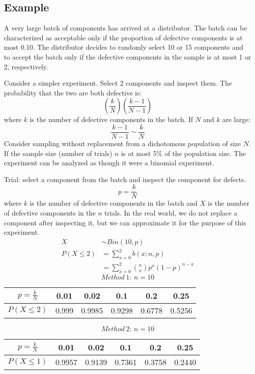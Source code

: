 \documentclass{math}
\begin{document}
\subsection*{Example}
A very large batch of components has arrived at a distributor. The batch
can be characterized as acceptable only if the proportion of defective
components is at most 0.10. The distributor decides to randomly select 10 or
15 components and to accept the batch only if the defective components in the
sample is at most 1 or 2, respectively. \par
Consider a simpler experiment. Select 2 components and inspect them. The
probability that the two are both defective is:
\[ (\frac{k}{N})(\frac{k-1}{N-1}) \]
where \( k \) is the number of defective components in the batch. If \( N \)
and \( k \) are large:
\[ \frac{k-1}{N-1}\sim\frac{k}{N} \]
Consider sampling without replacement from a dichotomous population of size
\( N \). If the sample size (number of trials) \( n \) is at most 5\% of the
population size. The experiment can be analyzed as though it were a binomial
experiment. \par
Trial: select a component from the batch and inspect the component for defects.
\[ p = \frac{k}{N} \]
where \( k \) is the number of defective components in the batch and \( X \) is
the number of defective components in the \( n \) trials. In the real world,
we do not replace a component after inspecting it, but we can approximate it
for the purpose of this experiment.
\begin{align*}
  X &\sim Bin(10,p) \\
  P(X\leq 2) &= \sum_{x=0}^{2}b(x;n,p) \\
  &= \sum_{x=0}^{2}\binom{n}{x}p^{x}(1-p)^{n-x}
\end{align*}
\[ Method\ 1:\ n = 10 \]
\begin{center}
  \begin{tabular}{|c|c|c|c|c|c|}
    \hline
    \( p = \frac{k}{N} \) & 0.01 & 0.02 & 0.1 & 0.2 & 0.25 \\
    \hline
    \( P(X\leq 2) \) & 0.999 & 0.9985 & 0.9298 & 0.6778 & 0.5256 \\
    \hline
  \end{tabular}
\end{center}
\[ Method\ 2:\ n = 10 \]
\begin{center}
  \begin{tabular}{|c|c|c|c|c|c|}
    \hline
    \( p = \frac{k}{N} \) & 0.01 & 0.02 & 0.1 & 0.2 & 0.25 \\
    \hline
    \( P(X\leq 1) \) & 0.9957 & 0.9139 & 0.7361 & 0.3758 & 0.2440 \\
    \hline
  \end{tabular}
\end{center}
\end{document}
